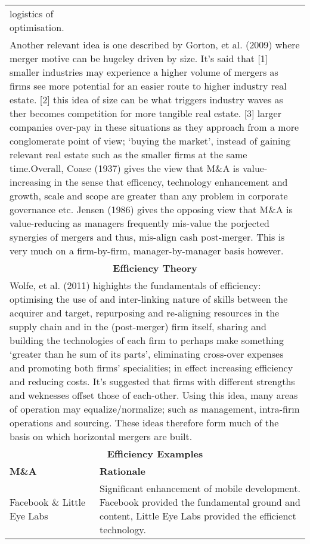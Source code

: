 \documentclass[11pt, english]{article}
\begin{document}
\begin{center}
\begin{longtable}{p{5cm}p{7.5cm}}
logistics of optimisation.\newline}\\
	\multicolumn{2}{p{13cm}}{Another relevant idea is one described by Gorton, et al. (2009) where merger motive can be hugeley driven by size. It's said that [1] smaller industries may experience a higher volume of mergers as firms see more potential for an easier route to higher industry real estate. [2] this idea of size can be what triggers industry waves as ther becomes competition for more tangible real estate. [3] larger companies over-pay in these situations as they approach from a more conglomerate point of view; `buying the market', instead of gaining relevant real estate such as the smaller firms at the same time.\newline\newline Overall, Coase (1937) gives the view that M\&A is value-increasing in the sense that efficency, technology enhancement and growth, scale and scope are greater than any problem in corporate governance etc. Jensen (1986) gives the opposing view that M\&A is value-reducing as managers frequently mis-value the porjected synergies of mergers and thus, mis-align cash post-merger. This is very much on a firm-by-firm, manager-by-manager basis however.}\\
        \hline
        \hline
        \multicolumn{2}{c}{\textbf{Efficiency Theory}}\\
        \hline
        \hline
        \multicolumn{2}{p{13cm}}{Wolfe, et al. (2011) highights the fundamentals of efficiency: optimising the use of and inter-linking nature of skills between the acquirer and target, repurposing and re-aligning resources in the supply chain and in the (post-merger) firm itself, sharing and building the technologies of each firm to perhaps make something `greater than he sum of its parts', eliminating cross-over expenses and promoting both firms' specialities; in effect increasing efficiency and reducing costs. It's suggested that firms with different strengths and weknesses offset those of each-other. Using this idea, many areas of operation may equalize/normalize; such as management, intra-firm operations and sourcing. These ideas therefore form much of the basis on which horizontal mergers are built.}\\
        \hline
        \multicolumn{2}{c}{\textbf{Efficiency Examples}}\\
        \hline
        \textbf{M\&A} & \textbf{Rationale}\\
        \hline
        Facebook \& Little Eye Labs & Significant enhancement of mobile development. Facebook provided the fundamental ground and content, Little Eye Labs provided the efficienct technology.\\

\end{longtable}
\end{center}
\end{document}
